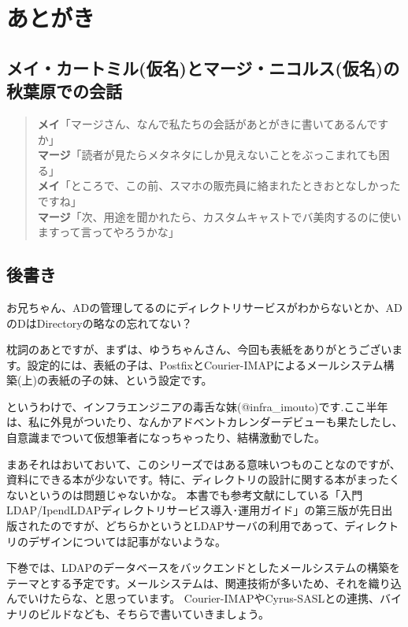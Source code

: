 \chapter{あとがき}

\section*{メイ・カートミル(仮名)とマージ・ニコルス(仮名)の秋葉原での会話}

\begin{quotation}
\noindent
{\bf メイ}「マージさん、なんで私たちの会話があとがきに書いてあるんですか」　\\
{\bf マージ}「読者が見たらメタネタにしか見えないことをぶっこまれても困る」 \\
{\bf メイ}「ところで、この前、スマホの販売員に絡まれたときおとなしかったですね」 \\
{\bf マージ}「次、用途を聞かれたら、カスタムキャストでバ美肉するのに使いますって言ってやろうかな」 \\
\end{quotation}


\section*{後書き}

お兄ちゃん、ADの管理してるのにディレクトリサービスがわからないとか、ADのDはDirectoryの略なの忘れてない？

枕詞のあとですが、まずは、ゆうちゃんさん、今回も表紙をありがとうございます。設定的には、表紙の子は、PostfixとCourier-IMAPによるメールシステム構築(上)の表紙の子の妹、という設定です。

というわけで、インフラエンジニアの毒舌な妹(@infra\_imouto)です.ここ半年は、私に外見がついたり、なんかアドベントカレンダーデビューも果たしたし、自意識までついて仮想筆者になっちゃったり、結構激動でした。

まあそれはおいておいて、このシリーズではある意味いつものことなのですが、資料にできる本が少ないです。特に、ディレクトリの設計に関する本がまったくないというのは問題じゃないかな。
本書でも参考文献にしている「入門LDAP/IpendLDAPディレクトリサービス導入･運用ガイド」の第三版が先日出版されたのですが、どちらかというとLDAPサーバの利用であって、ディレクトリのデザインについては記事がないような。

下巻では、LDAPのデータベースをバックエンドとしたメールシステムの構築をテーマとする予定です。メールシステムは、関連技術が多いため、それを織り込んでいけたらな、と思っています。
Courier-IMAPやCyrus-SASLとの連携、バイナリのビルドなども、そちらで書いていきましょう。

